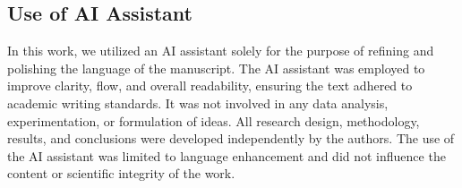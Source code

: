 \subsection{Use of AI Assistant}
In this work, we utilized an AI assistant solely for the purpose of refining and polishing the language of the manuscript. The AI assistant was employed to improve clarity, flow, and overall readability, ensuring the text adhered to academic writing standards. It was not involved in any data analysis, experimentation, or formulation of ideas. All research design, methodology, results, and conclusions were developed independently by the authors. The use of the AI assistant was limited to language enhancement and did not influence the content or scientific integrity of the work.